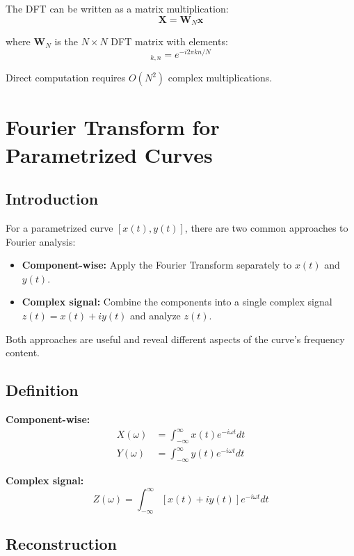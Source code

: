 \documentclass[11pt,a4paper]{article}
\begin{document}
The DFT can be written as a matrix multiplication:
\begin{equation}
\mathbf{X} = \mathbf{W}_N \mathbf{x}
\end{equation}

where $\mathbf{W}_N$ is the $N \times N$ DFT matrix with elements:
\begin{equation}
[\mathbf{W}_N]_{k,n} = e^{-i 2\pi k n / N}
\end{equation}

Direct computation requires $O(N^2)$ complex multiplications.

\section{Fourier Transform for Parametrized Curves}

\subsection{Introduction}

For a parametrized curve $[x(t), y(t)]$, there are two common approaches to Fourier analysis:
\begin{itemize}
    \item \textbf{Component-wise:} Apply the Fourier Transform separately to $x(t)$ and $y(t)$.
    \item \textbf{Complex signal:} Combine the components into a single complex signal $z(t) = x(t) + i y(t)$ and analyze $z(t)$.
\end{itemize}
Both approaches are useful and reveal different aspects of the curve's frequency content.

\subsection{Definition}

\textbf{Component-wise:}
\begin{align}
X(\omega) &= \int_{-\infty}^{\infty} x(t) e^{-i\omega t} dt \\
Y(\omega) &= \int_{-\infty}^{\infty} y(t) e^{-i\omega t} dt
\end{align}

\textbf{Complex signal:}
\begin{equation}
Z(\omega) = \int_{-\infty}^{\infty} [x(t) + i y(t)] e^{-i\omega t} dt
\end{equation}

\subsection{Reconstruction}
\end{document}
